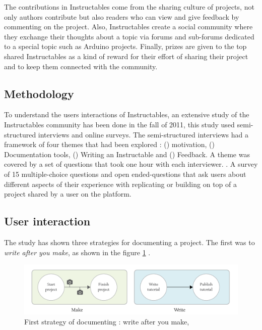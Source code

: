 The contributions in Instructables come from the sharing culture of projects, not only authors contribute but also readers who can view and give feedback by commenting on the project. Also, Instructables create a social community where they exchange their thoughts about a topic via forums and sub-forums dedicated to a special topic such as Arduino projects. Finally, prizes are given to the top shared Instructables as a kind of reward for their effort of sharing their project and to keep them connected with the community.

\subsection{Methodology} 

To understand the users interactions of Instructables, an extensive study of the Instructables community has been done in the fall of 2011, this study used semi-structured interviews and online surveys. The semi-structured interviews had a framework of four themes that had been explored : () motivation, () Documentation tools, () Writing an Instructable and () Feedback. A theme was covered by a set of questions that took one hour with each interviewer. \cite{scholar:Tseng:2014:PVP:2598510.2598540}. A survey of 15 multiple-choice questions and open ended-questions that ask users about different aspects of their experience with replicating or building on top of a project shared by a user on the platform.

\subsection{User interaction}

The study has shown three strategies for documenting a project. The first was to \textit{write after you make}, as shown in the figure \ref{img-writemake}  \cite{tseng2016making}.
\begin{figure}[ht!]
	\includegraphics[scale=0.34]{./images/img-writemake.png}
	\caption{First strategy of documenting : write after you make, \cite{tseng2016making}}
	\label{img-writemake}
\end{figure}

